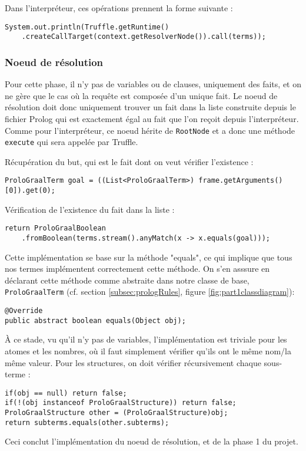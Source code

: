 \documentclass[../report.tex]{subfiles}
\begin{document}
Dans l'interpréteur, ces opérations prennent la forme suivante :
\begin{verbatim}
System.out.println(Truffle.getRuntime()
    .createCallTarget(context.getResolverNode()).call(terms));
\end{verbatim}
\subsubsection{Noeud de résolution}
Pour cette phase, il n'y pas de variables ou de clauses, uniquement des faits, et on ne gère que le cas où la requête est composée d'un unique fait. Le noeud de résolution doit donc uniquement trouver un fait dans la liste construite depuis le fichier Prolog qui est exactement égal au fait que l'on reçoit depuis l'interpréteur. Comme pour l'interpréteur, ce noeud hérite de \texttt{RootNode} et a donc une méthode \texttt{execute} qui sera appelée par Truffle.

Récupération du but, qui est le fait dont on veut vérifier l'existence :
\begin{verbatim}
ProloGraalTerm goal = ((List<ProloGraalTerm>) frame.getArguments()[0]).get(0);
\end{verbatim}
Vérification de l'existence du fait dans la liste :
\begin{verbatim}
return ProloGraalBoolean
    .fromBoolean(terms.stream().anyMatch(x -> x.equals(goal)));
\end{verbatim}
Cette implémentation se base sur la méthode "equals", ce qui implique que tous nos termes implémentent correctement cette méthode. On s'en asssure en déclarant cette méthode comme abstraite dans notre classe de base, \texttt{ProloGraalTerm} (cf. section \ref{subsec:prologRules}, figure \ref{fig:part1classdiagram}):
\begin{verbatim}
@Override
public abstract boolean equals(Object obj);
\end{verbatim}
À ce stade, vu qu'il n'y pas de variables, l'implémentation est triviale pour les atomes et les nombres, où il faut simplement vérifier qu'ils ont le même nom/la même valeur. Pour les structures, on doit vérifier récursivement chaque sous-terme :
\begin{verbatim}
if(obj == null) return false;
if(!(obj instanceof ProloGraalStructure)) return false;
ProloGraalStructure other = (ProloGraalStructure)obj;
return subterms.equals(other.subterms);
\end{verbatim}
Ceci conclut l'implémentation du noeud de résolution, et de la phase 1 du projet.
\end{document}
